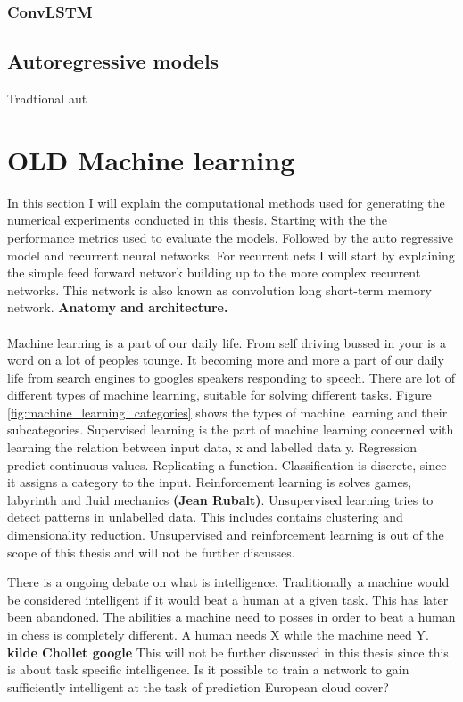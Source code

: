 \subsubsection{ConvLSTM}

\subsection{Autoregressive models}
Tradtional aut


\section{OLD Machine learning} \label{sec:intro_machine_learning}
In this section I will explain the computational methods used for generating the numerical experiments conducted in this thesis. Starting with the the performance metrics used to evaluate the models. Followed by the auto regressive model and recurrent neural networks. For recurrent nets I will start by explaining the simple feed forward network building up to the more complex recurrent networks. This network is also known as convolution long short-term memory network. \textbf{Anatomy and architecture.} 
\\ \\
Machine learning is a part of our daily life. From self driving bussed in  your is a word on a lot of peoples tounge. It becoming more and more a part of our daily life from search engines to googles speakers responding to speech. There are lot of different types of machine learning, suitable for solving different tasks. Figure \ref{fig:machine_learning_categories} shows the types of machine learning and their subcategories. Supervised learning is the part of machine learning concerned with learning the relation between input data, x and labelled data y. Regression predict continuous values. Replicating a function. Classification is discrete, since it assigns a category to the input. Reinforcement learning is solves games, labyrinth and fluid mechanics \textbf{(Jean Rubalt)}. Unsupervised learning tries to detect patterns in unlabelled data. This includes contains clustering and dimensionality reduction. Unsupervised and reinforcement learning is out of the scope of this thesis and will not be further discusses.

There is a ongoing debate on what is intelligence. Traditionally a machine would be considered intelligent if it would beat a human at a given task. This has later been abandoned. The abilities a machine need to posses in order to beat a human in chess is completely different. A human needs X while the machine need Y. \textbf{kilde Chollet google} This will not be further discussed in this thesis since this is about task specific intelligence. Is it possible to train a network to gain sufficiently intelligent at the task of prediction European cloud cover?

